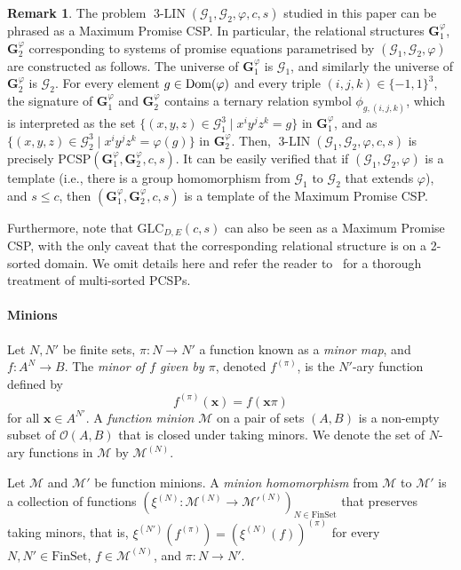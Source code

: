 \documentclass[a4paper,11pt]{article}
\theoremstyle{definition}
\newtheorem{remark}[theorem]{Remark}
\newcommand{\mnn}[1]{\mathscr{#1}}
\newcommand{\gr}{\mathscr{G}}
\newcommand{\bx}{\mathbf{x}}
\newcommand{\glc}{\mathrm{GLC}}
\newcommand{\pcsp}{\mathrm{PCSP}}
\newcommand{\dom}{\textnormal{Dom}}
\newcommand{\eq}{\ensuremath{\operatorname{3-LIN}}}
\newcommand{\FinSet}{\mathrm{FinSet}}
\begin{document}
\begin{remark}\label{re:pcsp-groups} 
The problem $\eq(\gr_1,\gr_2,\varphi,c,s)$ studied in this paper can be phrased as a Maximum Promise CSP. In particular, the relational structures $\mathbf{G}_1^\varphi$, $\mathbf{G}_2^\varphi$ corresponding to
systems of promise equations parametrised by  $(\gr_1, \gr_2, \varphi)$ are constructed as follows.
%
The universe of $\mathbf{G}_1^\varphi$ is $\gr_1$, and similarly the universe of
$\mathbf{G}_2^\varphi$ is $\gr_2$. For every element $g\in \dom(\varphi)$ and every
triple $(i,j,k) \in \{-1,1\}^3$, the signature of $\mathbf{G}_1^\varphi$ and
$\mathbf{G}_2^\varphi$ contains a ternary relation symbol $\phi_{g,(i,j,k)}$,
which is interpreted as the set $\{ (x,y,z) \in \gr^3_1 \mid x^i y^j z^k = g\}$
in  $\mathbf{G}_1^\varphi$, and as $\{(x,y,z) \in \gr_2^3 \mid x^i y^j z^k  =
\varphi(g) \}$ in  $\mathbf{G}_2^\varphi$.
%
Then, $\eq(\gr_1,\gr_2,\varphi,c,s)$ is precisely $\pcsp(\mathbf{G}_1^\varphi,\mathbf{G}_2^\varphi,c,s)$. 
%
It can be easily verified that if $(\gr_1,\gr_2,\varphi)$ is a template (i.e., there is a group homomorphism from $\gr_1$ to $\gr_2$ that extends $\varphi$), and $s \leq c$, then $(\mathbf{G}_1^\varphi,\mathbf{G}_2^\varphi,c,s)$ is a template of the Maximum Promise CSP.

Furthermore, note that $\glc_{D,E}(c,s)$ can also be seen as a Maximum Promise CSP, with the only caveat that the corresponding relational structure is on a 2-sorted domain. We omit details here and refer the reader to~\cite{Barto24:lics} for a thorough treatment of multi-sorted PCSPs.
%
\end{remark}

\paragraph{Minions}

Let $N,N'$ be finite sets, $\pi:N\to N'$ a function known as a \emph{minor map}, and $f : A^{N}\to B$. The \emph{minor of $f$ given by $\pi$}, denoted $f^{(\pi)}$, is the $N'$-ary function defined by
\[f^{(\pi)}(\bx) = f(\bx \pi)\]
for all $\bx \in A^{N'}$.
A \emph{function minion} $\mnn M$ on a pair of sets $(A,B)$ is a non-empty subset of $\mathscr{O}(A,B)$ that is closed under
taking minors. We denote the set of $N$-ary functions in $\mnn{M}$ by $\mnn{M}^{(N)}$.


 Let $\mnn M $ and $\mnn M'$ be function minions. A \emph{minion homomorphism} from $\mnn M $ to  $\mnn M'$ is a collection of functions $(\xi^{(N)}: \mnn M^{(N)} \to \mnn M'^{(N)})_{N \in \FinSet}$ that preserves taking minors, that is, $\xi^{(N')}(f^{(\pi)})=(\xi^{(N)}(f))^{(\pi)}$ for every $N, N' \in \FinSet$, $f \in \mnn{M}^{(N)}$, and $\pi:N \to N'$.
\end{document}
